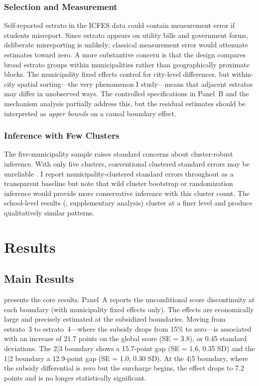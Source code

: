 \documentclass[12pt]{article}
\begin{document}
\subsubsection*{Selection and Measurement} Self-reported estrato in the ICFES data could contain measurement error if students misreport. Since estrato appears on utility bills and government forms, deliberate misreporting is unlikely; classical measurement error would attenuate estimates toward zero. A more substantive concern is that the design compares broad estrato groups within municipalities rather than geographically proximate blocks. The municipality fixed effects control for city-level differences, but within-city spatial sorting---the very phenomenon I study---means that adjacent estratos may differ in unobserved ways. The controlled specifications in Panel~B and the mechanism analysis partially address this, but the residual estimates should be interpreted as \textit{upper bounds} on a causal boundary effect.

\subsubsection*{Inference with Few Clusters} The five-municipality sample raises standard concerns about cluster-robust inference. With only five clusters, conventional clustered standard errors may be unreliable \citep{angrist2010inputs}. I report municipality-clustered standard errors throughout as a transparent baseline but note that wild cluster bootstrap or randomization inference would provide more conservative inference with this cluster count. The school-level results (, supplementary analysis) cluster at a finer level and produce qualitatively similar patterns.

\section{Results}

\subsection{Main Results}



 presents the core results. Panel~A reports the unconditional score discontinuity at each boundary (with municipality fixed effects only). The effects are economically large and precisely estimated at the subsidized boundaries. Moving from estrato~3 to estrato~4---where the subsidy drops from 15\% to zero---is associated with an increase of 21.7 points on the global score (SE = 3.8), or 0.45 standard deviations. The 2$|$3 boundary shows a 15.7-point gap (SE = 1.6, 0.35 SD) and the 1$|$2 boundary a 12.9-point gap (SE = 1.0, 0.30 SD). At the 4$|$5 boundary, where the subsidy differential is zero but the surcharge begins, the effect drops to 7.2 points and is no longer statistically significant.
\end{document}
